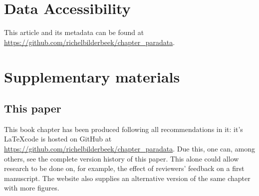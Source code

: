 \section{Data Accessibility}

This article and its metadata can be found at 
\url{https://github.com/richelbilderbeek/chapter_paradata}.




\iffalse

\newpage
\appendix
\section{Supplementary materials}

\renewcommand{\thefigure}{S\arabic{figure}}
\setcounter{figure}{0}

\renewcommand{\thetable}{S\arabic{table}}
\setcounter{table}{0}

\subsection{This paper}

This book chapter has been produced following all recommendations in it:
it's \LaTeX code is hosted on GitHub 
at \url{https://github.com/richelbilderbeek/chapter_paradata}.
Due this, one can, among others, see the complete version history of this paper.
This alone could allow research to be done on, for example,
the effect of reviewers' feedback on a first manuscript.
The website also supplies an alternative version of the same chapter
with more figures.

